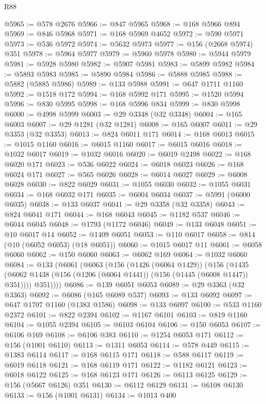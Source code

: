 \begin{lexlean}{R88}
\begin{coremodule}
@5965 := @578 @2676
@5966 := @847 @5965
@5968 := @168 @5966 @894
@5969 := @846 @5968
@5971 := @168 @5969 @4652
@5972 := @590 @5971
@5973 := @536 @5972
@5974 := @5632 @5973
@5977 := @156 (@2668 @5974) @351
@5978 := @5964 @5977
@5979 := @5960 @5978
@5980 := @5944 @5979
@5981 := @5928 @5980
@5982 := @5907 @5981
@5983 := @5899 @5982
@5984 := @5893 @5983
@5985 := @5890 @5984
@5986 := @5888 @5985
@5988 := @5882 (@5885 @5986)
@5989 := @133 @5988
@5991 := @647 @1711 @1160
@5992 := @1518 @172
@5994 := @168 @5992 @171
@5995 := @1520 @5994
@5996 := @830 @5995
@5998 := @168 @5996 @834
@5999 := @830 @5998
@6000 := @4998 @5999
@6003 := @29 @3348 (@32 @3348)
@6004 := @165 @6003
@6007 := @29 @1281 (@32 @1281)
@6008 := @165 @6007
@6011 := @29 @3353 (@32 @3353)
@6013 := @824 @6011 @171
@6014 := @168 @6013
@6015 := @1015 @1160
@6016 := @6015 @1160
@6017 := @6015 @6016
@6018 := @1032 @6017
@6019 := @1032 @6016
@6020 := @6019 @2498
@6022 := @168 @6020 @171
@6023 := @536 @6022
@6024 := @6018 @6023
@6026 := @168 @6024 @171
@6027 := @565 @6026
@6028 := @6014 @6027
@6029 := @6008 @6028
@6030 := @822 @6029
@6031 := @1055 @6030
@6032 := @1055 @6031
@6034 := @168 @6032 @171
@6035 := @6004 @6034
@6037 := @5991 (@6000 @6035)
@6038 := @133 @6037
@6041 := @29 @3358 (@32 @3358)
@6043 := @824 @6041 @171
@6044 := @168 @6043
@6045 := @1182 @537
@6046 := @6044 @6045
@6048 := @1793 (@1172 @6046)
@6049 := @133 @6048
@6051 := @10 @6017 @14
@6052 := @1409 @6051
@6053 := @110 @6017
@6058 := @814 (@10 (@6052 @6053) (@18 @6051))
@6060 := @1015 @6017 @11
@6061 := @6058 @6060
@6062 := @150 @6060
@6063 := @6062 @169
@6064 := @1032 @6060
@6084 := @133
    (@6061
      (@6063
        (@156
          (@1426 (@6064 @1429))
          (@156
            (@1435 (@6062 @1438 (@156 (@1206 (@6064 @1441)) (@156 (@1445 (@6008 @1447)) @351))))
            @351))))
@6086 := @139 @6051 @6053
@6089 := @29 @3363 (@32 @3363)
@6092 := @6086 (@165 @6089 @537)
@6093 := @133 @6092
@6097 := @647 @1707 @1160 (@1383 @1586)
@6098 := @133 @6097
@6100 := @533 @1160 @2372
@6101 := @822 @2394
@6102 := @1167 @6101
@6103 := @819 @1160
@6104 := @1055 @2394
@6105 := @6103 @6104
@6106 := @150 @6053
@6107 := @6106 @169
@6108 := @6106 @383
@6110 := @1254 @6053 @171
@6112 := @156 (@1001 @6110)
@6113 := @1311 @6053
@6114 := @578 @449
@6115 := @1383 @6114
@6117 := @168 @6115 @171
@6118 := @588 @6117
@6119 := @6019 @6118
@6121 := @168 @6119 @171
@6122 := @1182 @6121
@6123 := @6018 @6122
@6125 := @168 @6123 @171
@6126 := @6113 @6125
@6129 := @156 (@5667 @6126) @351
@6130 := @6112 @6129
@6131 := @6108 @6130
@6133 := @156 (@1001 @6131)
@6134 := @1013 @400

\end{coremodule}
\end{lexlean}
